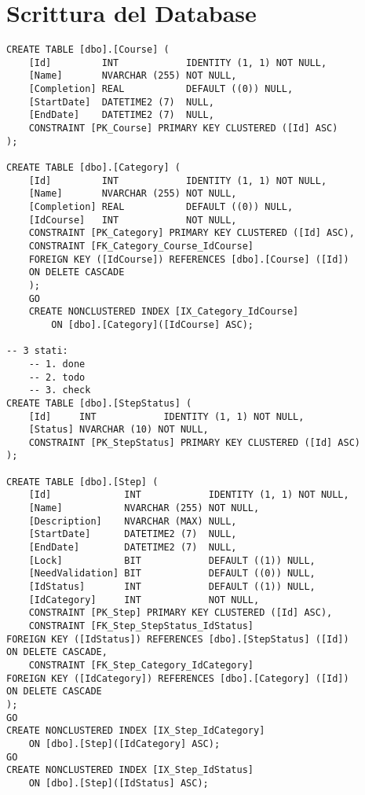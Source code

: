 \chapter{Scrittura del Database}
%
\label{appendice-database}
\begin{lstlisting}[style=sql_style, caption=tabelle per la creazione del database utilizzato]
CREATE TABLE [dbo].[Course] ( 
    [Id]         INT            IDENTITY (1, 1) NOT NULL, 
    [Name]       NVARCHAR (255) NOT NULL, 
    [Completion] REAL           DEFAULT ((0)) NULL, 
    [StartDate]  DATETIME2 (7)  NULL, 
    [EndDate]    DATETIME2 (7)  NULL, 
    CONSTRAINT [PK_Course] PRIMARY KEY CLUSTERED ([Id] ASC) 
); 

CREATE TABLE [dbo].[Category] ( 
    [Id]         INT            IDENTITY (1, 1) NOT NULL, 
    [Name]       NVARCHAR (255) NOT NULL, 
    [Completion] REAL           DEFAULT ((0)) NULL, 
    [IdCourse]   INT            NOT NULL, 
    CONSTRAINT [PK_Category] PRIMARY KEY CLUSTERED ([Id] ASC), 
    CONSTRAINT [FK_Category_Course_IdCourse]
    FOREIGN KEY ([IdCourse]) REFERENCES [dbo].[Course] ([Id]) 
    ON DELETE CASCADE 
    ); 
    GO 
    CREATE NONCLUSTERED INDEX [IX_Category_IdCourse] 
        ON [dbo].[Category]([IdCourse] ASC); 	

-- 3 stati: 
    -- 1. done 
    -- 2. todo 
    -- 3. check 
CREATE TABLE [dbo].[StepStatus] ( 
    [Id]     INT            IDENTITY (1, 1) NOT NULL, 
    [Status] NVARCHAR (10) NOT NULL, 
    CONSTRAINT [PK_StepStatus] PRIMARY KEY CLUSTERED ([Id] ASC) 
); 

CREATE TABLE [dbo].[Step] ( 
    [Id]             INT            IDENTITY (1, 1) NOT NULL, 
    [Name]           NVARCHAR (255) NOT NULL, 
    [Description]    NVARCHAR (MAX) NULL, 
    [StartDate]      DATETIME2 (7)  NULL, 
    [EndDate]        DATETIME2 (7)  NULL, 
    [Lock]           BIT            DEFAULT ((1)) NULL, 
    [NeedValidation] BIT            DEFAULT ((0)) NULL, 
    [IdStatus]       INT            DEFAULT ((1)) NULL, 
    [IdCategory]     INT            NOT NULL, 
    CONSTRAINT [PK_Step] PRIMARY KEY CLUSTERED ([Id] ASC), 
    CONSTRAINT [FK_Step_StepStatus_IdStatus]  
FOREIGN KEY ([IdStatus]) REFERENCES [dbo].[StepStatus] ([Id]) 
ON DELETE CASCADE, 
    CONSTRAINT [FK_Step_Category_IdCategory]  
FOREIGN KEY ([IdCategory]) REFERENCES [dbo].[Category] ([Id]) 
ON DELETE CASCADE 
); 
GO 
CREATE NONCLUSTERED INDEX [IX_Step_IdCategory] 
    ON [dbo].[Step]([IdCategory] ASC); 
GO 
CREATE NONCLUSTERED INDEX [IX_Step_IdStatus] 
    ON [dbo].[Step]([IdStatus] ASC); 


\end{lstlisting}
